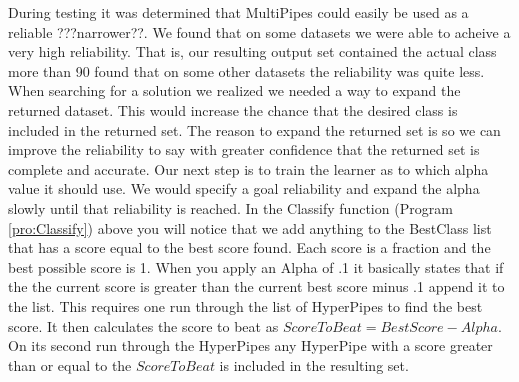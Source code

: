 During testing it was determined that MultiPipes could easily be used 
as a reliable ???narrower??. We found that on some datasets we were 
able to acheive a very high reliability. That is, our resulting output 
set contained the actual class more than 90%
found that on some other datasets the reliability was quite less. 
When searching for a solution we realized we needed a way to expand 
the returned dataset. This would increase the chance that the desired 
class is included in the returned set. The reason to expand the 
returned set is so we can improve the reliability to say with greater
confidence that the returned set is complete and accurate. Our next 
step is to train the learner as to which alpha value it should use. 
We would specify a goal reliability and expand the alpha slowly until 
that reliability is reached. In the Classify function (Program \ref{pro:Classify}) above you will 
notice that we add anything to the BestClass list that has a score 
equal to the best score found. Each score is a fraction and the best 
possible score is 1. When you apply an Alpha of .1 it basically 
states that if the the current score is greater than the current best 
score minus .1 append it to the list. This requires one run through the 
list of HyperPipes to find the best score. It then calculates the score 
to beat as \begin{math}ScoreToBeat = BestScore - Alpha\end{math}. On its second run through the 
HyperPipes any HyperPipe with a score greater than or equal to the 
\begin{math}ScoreToBeat\end{math} is included in the resulting set. 

